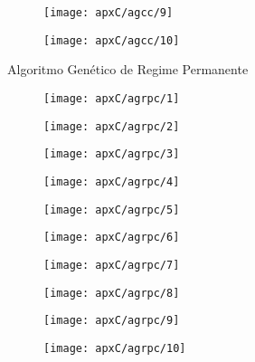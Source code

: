 \begin{figure}[H]
\centering

\texttt{[image: apxC/agcc/9]}

\end{figure}

\begin{figure}[H]
\centering

\texttt{[image: apxC/agcc/10]}

\end{figure}

Algoritmo Genético de Regime Permanente

\begin{figure}[H]
\centering

\texttt{[image: apxC/agrpc/1]}

\end{figure}

\begin{figure}[H]
\centering

\texttt{[image: apxC/agrpc/2]}

\end{figure}
\begin{figure}[H]
\centering

\texttt{[image: apxC/agrpc/3]}

\end{figure}
\begin{figure}[H]
\centering

\texttt{[image: apxC/agrpc/4]}

\end{figure}
\begin{figure}[H]
\centering

\texttt{[image: apxC/agrpc/5]}

\end{figure}
\begin{figure}[H]
\centering

\texttt{[image: apxC/agrpc/6]}

\end{figure}
\begin{figure}[H]
\centering

\texttt{[image: apxC/agrpc/7]}

\end{figure}
\begin{figure}[H]
\centering

\texttt{[image: apxC/agrpc/8]}

\end{figure}
\begin{figure}[H]
\centering

\texttt{[image: apxC/agrpc/9]}

\end{figure}
\begin{figure}[H]
\centering

\texttt{[image: apxC/agrpc/10]}

\end{figure}